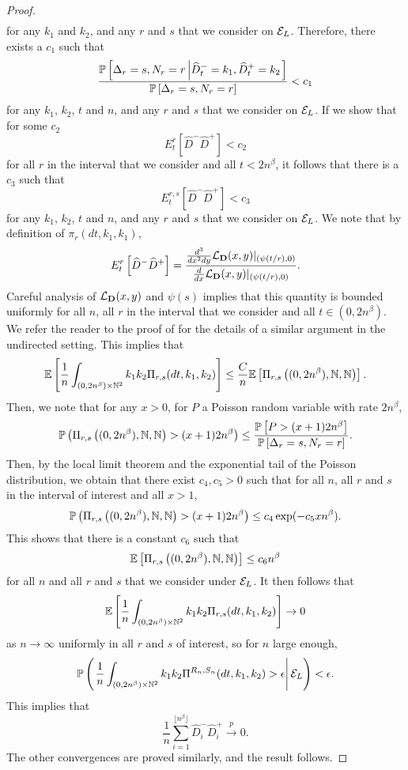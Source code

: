 \begin{proof}
\begin{align*}
\end{align*} for any $k_1$ and $k_2$, and any $r$ and $s$ that we consider on $\cE_L$. Therefore, there exists a $c_1$ such that
$$\frac{\P\left[ \Delta_r=s, N_r=r \left| \widehat{D}^-_t=k_1,\widehat{D}^+_t=k_2\right.\right]}{\P\left[ \Delta_r=s, N_r=r\right]}<c_1$$
for any $k_1$, $k_2$, $t$ and $n$, and any $r$ and $s$ that we consider on $\cE_L$. If we show that for some $c_2$ $${E}^r_t\left[\widehat{D}^-\widehat{D}^+\right]<c_2$$ for all $r$ in the interval that we consider and all $t<2n^\beta$, it follows that there is a $c_3$ such that
$${E}^{r,s}_t\left[\widehat{D}^-\widehat{D}^+\right]<c_3$$ 
for any $k_1$, $k_2$, $t$ and $n$, and any $r$ and $s$ that we consider on $\cE_L$.
We note that by definition of $\pi_r(dt,k_1,k_1)$, 
$${E}^r_t\left[\widehat{D}^-\widehat{D}^+\right]=\frac{\frac{d^3}{dx^2 dy}\cL_{\mathbf{D}}(x,y)|_{(\psi(t/r),0)}}{\frac{d}{dx}\cL_{\mathbf{D}}(x,y)|_{(\psi(t/r),0)}}.$$
Careful analysis of $\cL_{\mathbf{D}}(x,y)$ and $\psi(s)$ implies that this quantity is bounded uniformly for all $n$, all $r$ in the interval that we consider and all $t\in(0,2n^\beta)$. We refer the reader to the proof of   \cite[Lemma A.1]{josephComponentSizesCritical2014} for the details of a similar argument in the undirected setting.
This implies that 
$$\E\left[\frac{1}{n}\int_{(0,2n^\beta)\times \N^2}k_1k_2 \Pi_{r,s}(dt,k_1,k_2) \right]\leq \frac{C}{n}\E\left[\Pi_{r,s}\left((0,2n^\beta),\N,\N\right)\right].$$
Then, we note that for any $x>0$, for $P$ a Poisson random variable with rate $2n^\beta$,
$$\P\left(\Pi_{r,s}\left((0,2n^\beta),\N,\N\right)>(x+1)2n^\beta\right)\leq \frac{\P\left[P>(x+1)2n^\beta \right]}{\P\left[ \Delta_r=s, N_r=r\right]}.$$
Then, by the local limit theorem and the exponential tail of the Poisson distribution, we obtain that there exist $c_4,c_5>0$ such that for all $n$, all $r$ and $s$ in the interval of interest and all $x>1$,
$$\P\left(\Pi_{r,s}\left((0,2n^\beta),\N,\N\right)>(x+1)2n^\beta\right)\leq c_4\exp(-c_5xn^\beta).$$
This shows that there is a constant $c_6$ such that 
$$\E\left[\Pi_{r,s}\left((0,2n^\beta),\N,\N\right)\right]\leq c_6 n^\beta$$
for all $n$ and all $r$ and $s$ that we consider under $\cE_L$. 
It then follows that 
$$\E\left[\frac{1}{n}\int_{(0,2n^\beta)\times \N^2}k_1k_2 \Pi_{r,s}(dt,k_1,k_2) \right]\to 0$$
as $n\to \infty$ uniformly in all $r$ and $s$ of interest, so for $n$ large enough,
$$\P\left(\left.\frac{1}{n}\int_{(0,2n^\beta)\times \N^2}k_1k_2 \Pi^{R_n,S_n}(dt,k_1,k_2)>\epsilon  \right|\cE_L \right)<\epsilon.$$
This implies that
$$\frac{1}{n}\sum_{i=1}^{\lfloor n^\beta \rfloor}\widehat{D}_i^- \widehat{D}_i^+\overset{p}{\to}0.$$
The other convergences are proved similarly, and the result follows. 
\end{proof}